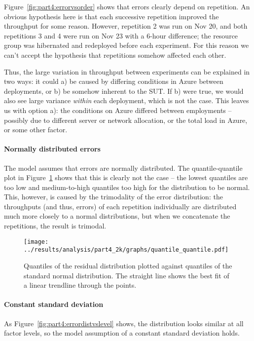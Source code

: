 \documentclass[11pt]{article}
\begin{document}
Figure~\ref{fig:part4:errorvsorder} shows that errors clearly depend on repetition. An obvious hypothesis here is that each successive repetition improved the throughput for some reason. However, repetition 2 was run on Nov 20, and both repetitions 3 and 4 were run on Nov 23 with a 6-hour difference; the resource group was hibernated and redeployed before each experiment. For this reason we can't accept the hypothesis that repetitions somehow affected each other.

Thus, the large variation in throughput between experiments can be explained in two ways: it could a) be caused by differing conditions in Azure between deployments, or b) be somehow inherent to the SUT. If b) were true, we would also see large variance \emph{within} each deployment, which is not the case. This leaves us with option a): the conditions on Azure differed between employments -- possibly due to different server or network allocation, or the total load in Azure, or some other factor.

\paragraph{Normally distributed errors}

The model assumes that errors are normally distributed. The quantile-quantile plot in Figure~\ref{fig:part4:quantile_quantile} shows that this is clearly not the case -- the lowest quantiles are too low and medium-to-high quantiles too high for the distribution to be normal. This, however, is caused by the trimodality of the error distribution: the throughputs (and thus, errors) of each repetition individually are distributed much more closely to a normal distributions, but when we concatenate the repetitions, the result is trimodal.

\begin{figure}
\centering
\texttt{[image: ../results/analysis/part4\_2k/graphs/quantile\_quantile.pdf]}
\caption{Quantiles of the residual distribution plotted against quantiles of the standard normal distribution. The straight line shows the best fit of a linear trendline through the points.}
\label{fig:part4:quantile_quantile}
\end{figure}


\paragraph{Constant standard deviation} As Figure~\ref{fig:part4:errordistvslevel} shows, the distribution looks similar at all factor levels, so the model assumption of a constant standard deviation holds.
\end{document}
